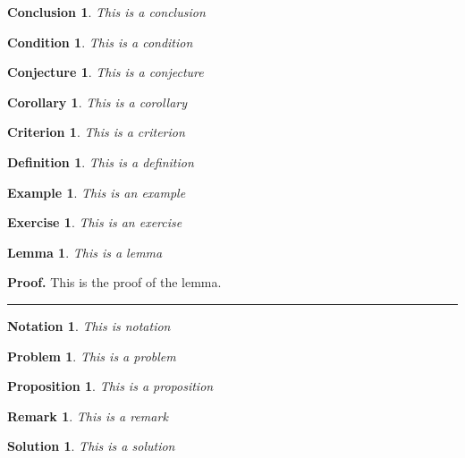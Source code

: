 \documentclass{article}
\newtheorem{conclusion}[theorem]{Conclusion}
\newtheorem{condition}[theorem]{Condition}
\newtheorem{conjecture}[theorem]{Conjecture}
\newtheorem{corollary}[theorem]{Corollary}
\newtheorem{criterion}[theorem]{Criterion}
\newtheorem{definition}[theorem]{Definition}
\newtheorem{example}[theorem]{Example}
\newtheorem{exercise}[theorem]{Exercise}
\newtheorem{lemma}[theorem]{Lemma}
\newtheorem{notation}[theorem]{Notation}
\newtheorem{problem}[theorem]{Problem}
\newtheorem{proposition}[theorem]{Proposition}
\newtheorem{remark}[theorem]{Remark}
\newtheorem{solution}[theorem]{Solution}
\newenvironment{proof}[1][Proof]{\noindent\textbf{#1.} }{\ \rule{0.5em}{0.5em}}
\begin{document}
\begin{conclusion}
This is a conclusion
\end{conclusion}

\begin{condition}
This is a condition
\end{condition}

\begin{conjecture}
This is a conjecture
\end{conjecture}

\begin{corollary}
This is a corollary
\end{corollary}

\begin{criterion}
This is a criterion
\end{criterion}

\begin{definition}
This is a definition
\end{definition}

\begin{example}
This is an example
\end{example}

\begin{exercise}
This is an exercise
\end{exercise}

\begin{lemma}
This is a lemma
\end{lemma}

\begin{proof}
This is the proof of the lemma.
\end{proof}

\begin{notation}
This is notation
\end{notation}

\begin{problem}
This is a problem
\end{problem}

\begin{proposition}
This is a proposition
\end{proposition}

\begin{remark}
This is a remark
\end{remark}

\begin{solution}
This is a solution
\end{solution}
\end{document}
